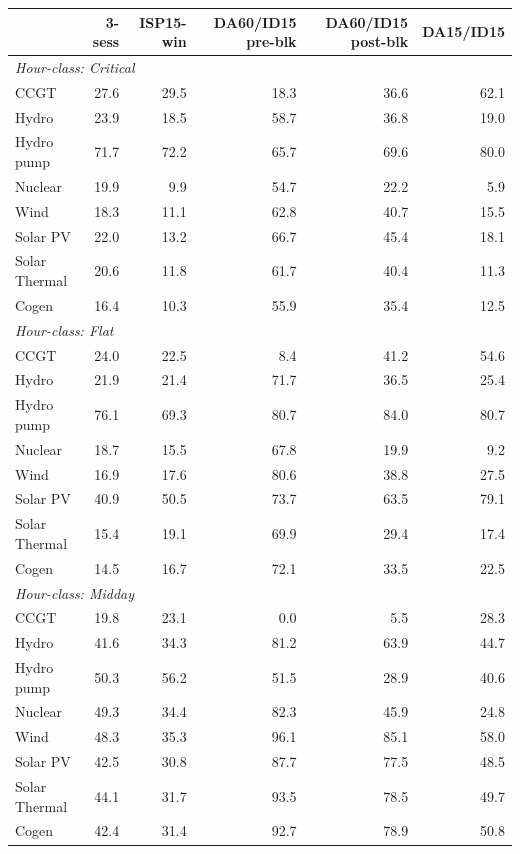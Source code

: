 \begin{tabular}{l r r r r r}
\toprule
 & 3-sess & ISP15-win & DA60/ID15 pre-blk & DA60/ID15 post-blk & DA15/ID15 \\
\midrule
\multicolumn{6}{l}{\textit{Hour-class: Critical}} \\
CCGT & 27.6 & 29.5 & 18.3 & 36.6 & 62.1 \\
Hydro & 23.9 & 18.5 & 58.7 & 36.8 & 19.0 \\
Hydro pump & 71.7 & 72.2 & 65.7 & 69.6 & 80.0 \\
Nuclear & 19.9 & 9.9 & 54.7 & 22.2 & 5.9 \\
Wind & 18.3 & 11.1 & 62.8 & 40.7 & 15.5 \\
Solar PV & 22.0 & 13.2 & 66.7 & 45.4 & 18.1 \\
Solar Thermal & 20.6 & 11.8 & 61.7 & 40.4 & 11.3 \\
Cogen & 16.4 & 10.3 & 55.9 & 35.4 & 12.5 \\
\midrule
\multicolumn{6}{l}{\textit{Hour-class: Flat}} \\
CCGT & 24.0 & 22.5 & 8.4 & 41.2 & 54.6 \\
Hydro & 21.9 & 21.4 & 71.7 & 36.5 & 25.4 \\
Hydro pump & 76.1 & 69.3 & 80.7 & 84.0 & 80.7 \\
Nuclear & 18.7 & 15.5 & 67.8 & 19.9 & 9.2 \\
Wind & 16.9 & 17.6 & 80.6 & 38.8 & 27.5 \\
Solar PV & 40.9 & 50.5 & 73.7 & 63.5 & 79.1 \\
Solar Thermal & 15.4 & 19.1 & 69.9 & 29.4 & 17.4 \\
Cogen & 14.5 & 16.7 & 72.1 & 33.5 & 22.5 \\
\midrule
\multicolumn{6}{l}{\textit{Hour-class: Midday}} \\
CCGT & 19.8 & 23.1 & 0.0 & 5.5 & 28.3 \\
Hydro & 41.6 & 34.3 & 81.2 & 63.9 & 44.7 \\
Hydro pump & 50.3 & 56.2 & 51.5 & 28.9 & 40.6 \\
Nuclear & 49.3 & 34.4 & 82.3 & 45.9 & 24.8 \\
Wind & 48.3 & 35.3 & 96.1 & 85.1 & 58.0 \\
Solar PV & 42.5 & 30.8 & 87.7 & 77.5 & 48.5 \\
Solar Thermal & 44.1 & 31.7 & 93.5 & 78.5 & 49.7 \\
Cogen & 42.4 & 31.4 & 92.7 & 78.9 & 50.8 \\
\midrule
\bottomrule
\end{tabular}
